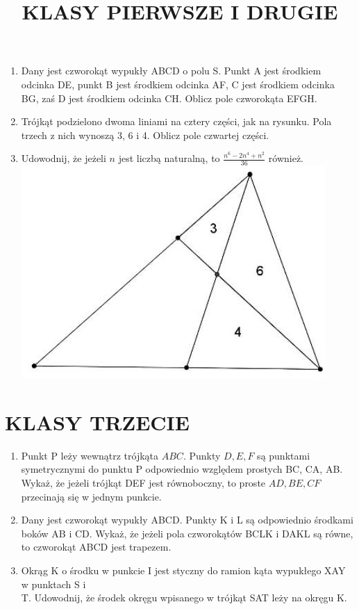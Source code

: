\documentclass[10pt]{article}
\title{KLASY PIERWSZE I DRUGIE }
\author{}
\date{}
\begin{document}
\maketitle
\begin{enumerate}
  \item Dany jest czworokąt wypukły ABCD o polu S. Punkt A jest środkiem odcinka DE, punkt B jest środkiem odcinka AF, C jest środkiem odcinka BG, zaś D jest środkiem odcinka CH. Oblicz pole czworokąta EFGH.
  \item Trójkąt podzielono dwoma liniami na cztery części, jak na rysunku. Pola trzech z nich wynoszą 3, 6 i 4. Oblicz pole czwartej części.
  \item Udowodnij, że jeżeli \(n\) jest liczbą naturalną, to \(\frac{n^{6}-2 n^{4}+n^{2}}{36}\) również.\\
\includegraphics[max width=\textwidth, center]{2024_11_21_ec1df8d0df9314a06be5g-1}
\end{enumerate}

\section*{KLASY TRZECIE}
\begin{enumerate}
  \item Punkt P leży wewnątrz trójkąta \(A B C\). Punkty \(D, E, F\) są punktami symetrycznymi do punktu P odpowiednio względem prostych BC, CA, AB. Wykaż, że jeżeli trójkąt DEF jest równoboczny, to proste \(A D, B E, C F\) przecinają się w jednym punkcie.
  \item Dany jest czworokąt wypukły ABCD. Punkty K i L są odpowiednio środkami boków AB i CD. Wykaż, że jeżeli pola czworokątów BCLK i DAKL są równe, to czworokąt ABCD jest trapezem.
  \item Okrąg K o środku w punkcie I jest styczny do ramion kąta wypukłego XAY w punktach S i\\
T. Udowodnij, że środek okręgu wpisanego w trójkąt SAT leży na okręgu K.
\end{enumerate}
\end{document}
